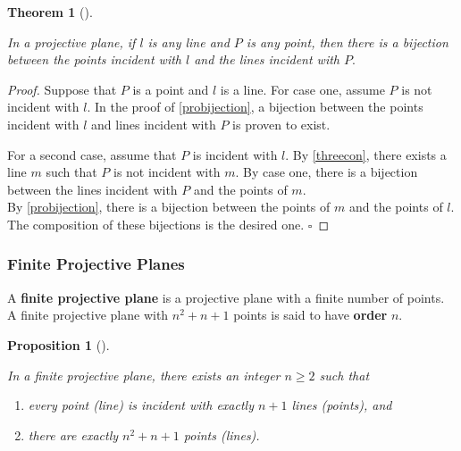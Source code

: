 \documentclass[
  twoside,
  12pt,
  letterpaper,
  fleqn]{article}
\providecommand{\tightlist}{%
  \setlength{\itemsep}{0pt}\setlength{\parskip}{0pt}}\usepackage{longtable,booktabs,array}
\theoremstyle{definition}
\theoremstyle{definition}
\theoremstyle{plain}
\newtheorem{proposition}{Proposition}[section]
\theoremstyle{plain}
\newtheorem{theorem}{Theorem}[section]
\theoremstyle{remark}
\begin{document}
\begin{theorem}[]\protect\hypertarget{thm-biptln}{}\label{thm-biptln}

In a projective plane, if \(l\) is any line and \(P\) is any point, then
there is a bijection between the points incident with \(l\) and the
lines incident with \(P.\)

\end{theorem}

\begin{proof}

Suppose that \(P\) is a point and \(l\) is a line. For case one, assume
\(P\) is not incident with \(l.\) In the proof of \eqref{probijection},
a bijection between the points incident with \(l\) and lines incident
with \(P\) is proven to exist.

For a second case, assume that \(P\) is incident with \(l.\) By
\eqref{threecon}, there exists a line \(m\) such that \(P\) is not
incident with \(m.\) By case one, there is a bijection between the lines
incident with \(P\) and the points of \(m.\)\\
By \eqref{probijection}, there is a bijection between the points of
\(m\) and the points of \(l.\) The composition of these bijections is
the desired one. \(\square\)

\end{proof}

\hypertarget{finite-projective-planes}{%
\subsubsection{Finite Projective
Planes}\label{finite-projective-planes}}

A \textbf{finite projective plane} is a projective plane with a finite
number of points. A finite projective plane with \(n^2+n+1\) points is
said to have \textbf{order} \(n.\)

\begin{proposition}[]\protect\hypertarget{prp-fpp}{}\label{prp-fpp}

In a finite projective plane, there exists an integer \(n\geq 2\) such
that

\begin{enumerate}
\def\labelenumi{\arabic{enumi}.}
\tightlist
\item
  every point (line) is incident with exactly \(n+1\) lines (points),
  and
\item
  there are exactly \(n^2+n+1\) points (lines).
\end{enumerate}

\end{proposition}
\end{document}
